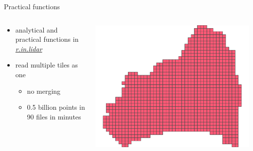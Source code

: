 \documentclass[xcolor={dvipsnames,usenames},beamer,aspectratio=169]{beamer}
\newcommand{\gmodule}[1]{\href{http://grass.osgeo.org/grass71/manuals/#1.html}{\emph{#1}}}
\begin{document}
\begin{frame}{Practical functions}

\begin{columns}
\begin{column}{0.45\textwidth}

 \begin{itemize}
  \item analytical and practical functions in \gmodule{r.in.lidar}
  \item read multiple tiles as one
    \begin{itemize}
    \item no merging
    \item 0.5 billion points in 90 files in minutes
    \end{itemize}
\end{itemize}

\end{column}
\begin{column}{0.54\textwidth}

\begin{center}
  \includegraphics[width=\textwidth]{features/tiles}
\end{center}

\end{column}
\end{columns}

\end{frame}
\end{document}

